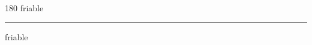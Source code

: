 
\begin{frame}
\begin{center}
\begin{turn}{180}
{\fontsize{2.5cm}{1em}\selectfont friable}
\end{turn}
\vspace{1em}\par  
\hrule
\vspace{1em}\par  
{\fontsize{2.5cm}{1em}\selectfont friable}
\end{center}
\end{frame}
